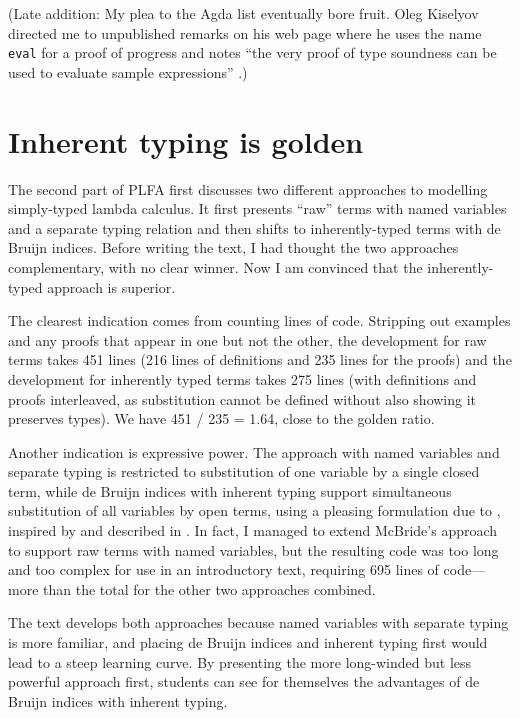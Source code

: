 \documentclass[runningheads]{llncs}
\begin{document}
(Late addition: My plea to the Agda list eventually bore fruit.  Oleg
Kiselyov directed me to unpublished remarks on his web page where he
uses the name \texttt{eval} for a proof of progress and notes ``the
very proof of type soundness can be used to evaluate sample
expressions'' \citet{Kiselyov-2009}.)


\section{Inherent typing is golden}

The second part of PLFA first discusses two different approaches to
modelling simply-typed lambda calculus.  It first presents ``raw''
terms with named variables and a separate typing relation and
then shifts to inherently-typed terms with de Bruijn indices.
Before writing the text, I had thought the two approaches
complementary, with no clear winner.  Now I am convinced that the
inherently-typed approach is superior.

The clearest indication comes from counting lines of code.
Stripping out examples and any proofs that appear in one but not the
other, the development for raw terms takes 451 lines (216 lines of
definitions and 235 lines for the proofs) and the development for
inherently typed terms takes 275 lines (with definitions and proofs
interleaved, as substitution cannot be defined without
also showing it preserves types).  We have 451 / 235 = 1.64, close
to the golden ratio.

Another indication is expressive power. The approach with named
variables and separate typing is restricted to substitution of one
variable by a single closed term, while de Bruijn indices with
inherent typing support simultaneous substitution of all variables by
open terms, using a pleasing formulation due to \citet{McBride-2005},
inspired by \citet{Goguen-and-McKinna-1997} and described
in \citet{Allais-et-al-2017}. In fact, I managed to extend
McBride's approach to support raw terms with named variables, but the
resulting code was too long and too complex for use in an introductory
text, requiring 695 lines of code---more than the total for the other
two approaches combined.

The text develops both approaches because named variables with
separate typing is more familiar, and placing de Bruijn indices and
inherent typing first would lead to a steep learning curve.  By
presenting the more long-winded but less powerful approach first,
students can see for themselves the advantages of de Bruijn indices
with inherent typing.
\end{document}
